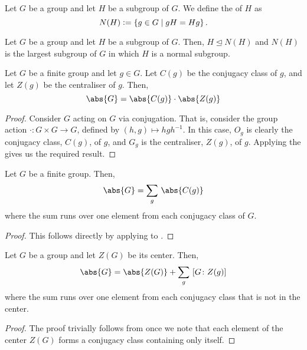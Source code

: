 \begin{defn}
    Let $G$ be a group and let $H$ be a subgroup of $G$. We define the  of $H$ as
    \[
        N(H) \vcentcolon= \left\{ g \in G \mid gH = Hg \right\}.
    \]
\end{defn}
\begin{prop} \label{prop:normaliser-properties}
    Let $G$ be a group and let $H$ be a subgroup of $G$. Then, $H \trianglelefteq N(H)$ and $N(H)$ is the largest subgroup of $G$ in which $H$ is a normal subgroup. 
\end{prop}



\begin{theorem} \label{thm:cardinality-of-conjugacy}
    Let $G$ be a finite group and let $g \in G$. Let $C(g)$ be the conjugacy class of $g$, and let $Z(g)$ be the centraliser of $g$. Then, 
    \[
        \abs{G} = \abs{C(g)} \cdot \abs{Z(g)}
    \]
\end{theorem}
\begin{proof}
    Consider $G$ acting on $G$ via conjugation. That is, consider the group action $\cdot \colon G \times G \to G$, defined by $(h,g) \mapsto hgh^{-1}$. In this case, $O_g$ is clearly the conjugacy class, $C(g)$, of $g$, and $G_g$ is the centraliser, $Z(g)$, of $g$. Applying the  gives us the required result.
\end{proof}

\begin{cor} \label{cor:|S|-in-terms-of-conjugacy}
Let $G$ be a finite group. Then, 
\[
    \abs{G} = \sum_{g}\, \abs{C(g)}
\]
where the sum runs over one element from each conjugacy class of $G$.
\end{cor}
\begin{proof}
    This follows directly by applying  to .
\end{proof}

\begin{cor} \label{cor:class-equation}
    Let $G$ be a group and let $Z(G)$ be its center. Then, 
    \[
        \abs{G} = \abs{Z(G)} + \sum_{g} \, \left[ G \colon Z(g) \right]
    \]
    where the sum runs over one element from each conjugacy class that is not in the center.
\end{cor}
\begin{proof}
    The proof trivially follows from  once we note that each element of the center $Z(G)$ forms a conjugacy class containing only itself.
\end{proof}

